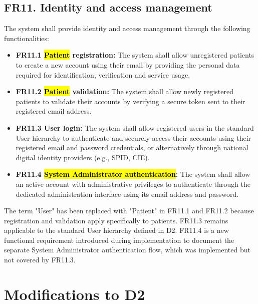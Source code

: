 \documentclass[12pt, a4paper]{article}
\begin{document}
\subsection{FR11. Identity and access management} \label{FR11}
The system shall provide identity and access management through the following functionalities:
\begin{itemize}
    \item \textbf{FR11.1 \hl{Patient} registration:} The system shall allow unregistered patients to create a new account using their email by providing the personal data required for identification, verification and service usage.

    \item \textbf{FR11.2 \hl{Patient} validation:} The system shall allow newly registered patients to validate their accounts by verifying a secure token sent to their registered email address.

    \item \textbf{FR11.3 User login:} The system shall allow registered users in the standard User hierarchy to authenticate and securely access their accounts using their registered email and password credentials, or alternatively through national digital identity providers (e.g., SPID, CIE).

    \item \textbf{FR11.4 \hl{System Administrator authentication}:} The system shall allow an active account with administrative privileges to authenticate through the dedicated administration interface using its email address and password. 
\end{itemize}
\vspace{0.3cm}

The term "User" has been replaced with "Patient" in FR11.1 and FR11.2 because registration and validation apply specifically to patients. FR11.3 remains applicable to the standard User hierarchy defined in D2. FR11.4 is a new functional requirement introduced during implementation to document the separate System Administrator authentication flow, which was implemented but not covered by FR11.3.



\section{Modifications to D2}
\end{document}
